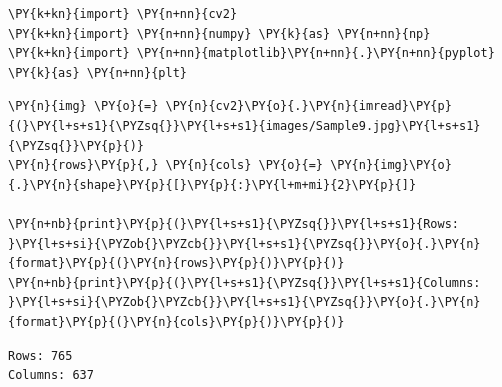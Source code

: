 \vspace{0.5cm}

\begin{tcolorbox}[breakable, size=fbox, boxrule=1pt, pad at break*=1mm,colback=cellbackground, colframe=cellborder]
	\begin{Verbatim}[commandchars=\\\{\}]
\PY{k+kn}{import} \PY{n+nn}{cv2}
\PY{k+kn}{import} \PY{n+nn}{numpy} \PY{k}{as} \PY{n+nn}{np}
\PY{k+kn}{import} \PY{n+nn}{matplotlib}\PY{n+nn}{.}\PY{n+nn}{pyplot} \PY{k}{as} \PY{n+nn}{plt}
	\end{Verbatim}
\end{tcolorbox}

\begin{tcolorbox}[breakable, size=fbox, boxrule=1pt, pad at break*=1mm,colback=cellbackground, colframe=cellborder]
	\begin{Verbatim}[commandchars=\\\{\}]
\PY{n}{img} \PY{o}{=} \PY{n}{cv2}\PY{o}{.}\PY{n}{imread}\PY{p}{(}\PY{l+s+s1}{\PYZsq{}}\PY{l+s+s1}{images/Sample9.jpg}\PY{l+s+s1}{\PYZsq{}}\PY{p}{)}
\PY{n}{rows}\PY{p}{,} \PY{n}{cols} \PY{o}{=} \PY{n}{img}\PY{o}{.}\PY{n}{shape}\PY{p}{[}\PY{p}{:}\PY{l+m+mi}{2}\PY{p}{]}

\PY{n+nb}{print}\PY{p}{(}\PY{l+s+s1}{\PYZsq{}}\PY{l+s+s1}{Rows: }\PY{l+s+si}{\PYZob{}\PYZcb{}}\PY{l+s+s1}{\PYZsq{}}\PY{o}{.}\PY{n}{format}\PY{p}{(}\PY{n}{rows}\PY{p}{)}\PY{p}{)}
\PY{n+nb}{print}\PY{p}{(}\PY{l+s+s1}{\PYZsq{}}\PY{l+s+s1}{Columns: }\PY{l+s+si}{\PYZob{}\PYZcb{}}\PY{l+s+s1}{\PYZsq{}}\PY{o}{.}\PY{n}{format}\PY{p}{(}\PY{n}{cols}\PY{p}{)}\PY{p}{)}
	\end{Verbatim}
\end{tcolorbox}

\begin{Verbatim}[commandchars=\\\{\}]
Rows: 765
Columns: 637
\end{Verbatim}

